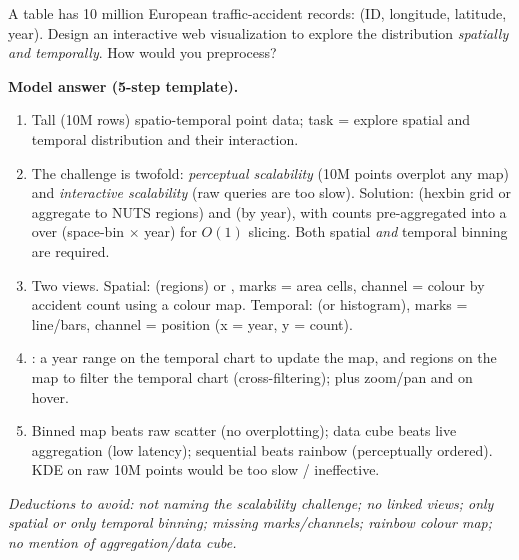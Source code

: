 \begin{qbox}
A table has 10 million European traffic-accident records: (ID, longitude,
latitude, year). Design an interactive web visualization to explore the
distribution \emph{spatially and temporally}. How would you preprocess?

\medskip\noindent\textbf{Model answer (5-step template).}
\begin{enumerate}[leftmargin=1.4em]
  \item {} Tall (10M rows) spatio-temporal point data;
        task = explore spatial and temporal distribution and their interaction.
  \item {} The challenge is twofold:
        \emph{perceptual scalability} (10M points overplot any map) and
        \emph{interactive scalability} (raw queries are too slow). Solution:
         (hexbin grid or aggregate to NUTS regions) and
         (by year), with counts pre-aggregated into a
         over (space-bin $\times$ year) for $O(1)$ slicing.
        Both spatial \emph{and} temporal binning are required.
  \item {} Two views. Spatial:  (regions)
        or , marks = area cells, channel = colour by accident
        count using a  colour map. Temporal: 
        (or histogram), marks = line/bars, channel = position (x = year,
        y = count).
  \item {} : 
        a year range on the temporal chart to update the map, and 
        regions on the map to filter the temporal chart (cross-filtering);
        plus zoom/pan and  on hover.
  \item {} Binned map beats raw scatter (no
        overplotting); data cube beats live aggregation (low latency);
        sequential beats rainbow (perceptually ordered). KDE on raw 10M points
        would be too slow / ineffective.
\end{enumerate}
\textit{Deductions to avoid: not naming the scalability challenge; no linked
views; only spatial or only temporal binning; missing marks/channels; rainbow
colour map; no mention of aggregation/data cube.}
\end{qbox}

